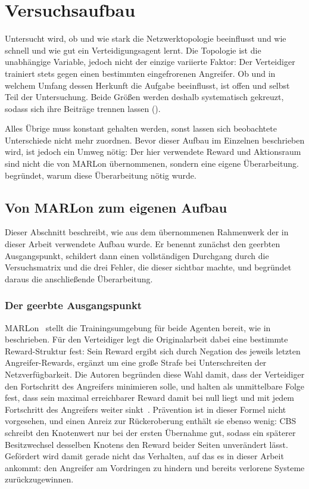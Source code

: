 \chapter{Versuchsaufbau}
\label{ch:versuchsaufbau}

Untersucht wird, ob und wie stark die Netzwerktopologie beeinflusst und wie
schnell und wie gut ein Verteidigungsagent lernt. Die Topologie ist die
unabhängige Variable, jedoch nicht der einzige variierte Faktor: Der
Verteidiger trainiert stets gegen einen bestimmten eingefrorenen Angreifer.
Ob und in welchem Umfang dessen Herkunft die Aufgabe beeinflusst, ist offen und
selbst Teil der Untersuchung. Beide Größen werden deshalb systematisch
gekreuzt, sodass sich ihre Beiträge trennen lassen ().

Alles Übrige muss konstant gehalten werden, sonst lassen sich beobachtete
Unterschiede nicht mehr zuordnen. Bevor dieser Aufbau im Einzelnen beschrieben
wird, ist jedoch ein Umweg nötig: Der hier verwendete Reward und Aktionsraum
sind nicht die von MARLon übernommenen, sondern eine eigene Überarbeitung.
 begründet, warum diese Überarbeitung nötig wurde.

\section{Von MARLon zum eigenen Aufbau}
\label{sec:vorarbeiten}

Dieser Abschnitt beschreibt, wie aus dem übernommenen Rahmenwerk der in
dieser Arbeit verwendete Aufbau wurde. Er benennt zunächst den geerbten
Ausgangspunkt, schildert dann einen vollständigen Durchgang durch die
Versuchsmatrix und die drei Fehler, die dieser sichtbar machte, und begründet
daraus die anschließende Überarbeitung.

\subsection{Der geerbte Ausgangspunkt}
\label{sec:marlon-original}

MARLon~\autocite{marlon} stellt die Trainingsumgebung für beide Agenten
bereit, wie in  beschrieben. Für den Verteidiger legt die
Originalarbeit dabei eine bestimmte Reward-Struktur fest: Sein Reward ergibt
sich durch Negation des jeweils letzten Angreifer-Rewards, ergänzt um eine
große Strafe bei Unterschreiten der Netzverfügbarkeit. Die Autoren begründen
diese Wahl damit, dass der Verteidiger den Fortschritt des Angreifers
minimieren solle, und halten als unmittelbare Folge fest, dass sein maximal
erreichbarer Reward damit bei null liegt und mit jedem Fortschritt des
Angreifers weiter sinkt~\autocite{marlon}. Prävention ist in dieser Formel nicht vorgesehen, und einen Anreiz zur
Rückeroberung enthält sie ebenso wenig: \ac{CBS} schreibt den Knotenwert nur bei der ersten Übernahme gut, sodass
ein späterer Besitzwechsel desselben Knotens den Reward beider Seiten
unverändert lässt. Gefördert wird damit gerade nicht das Verhalten, auf das
es in dieser Arbeit ankommt: den Angreifer am Vordringen zu hindern und
bereits verlorene Systeme zurückzugewinnen.

